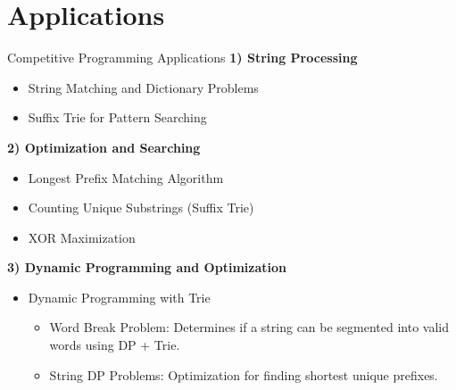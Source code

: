 \section{Applications}


\begin{frame}{Competitive Programming Applications}
    \textbf{1) String Processing}
\begin{itemize}
    \item String Matching and Dictionary Problems
    \item Suffix Trie for Pattern Searching
\end{itemize}

\textbf{2) Optimization and Searching}
\begin{itemize}
    \item Longest Prefix Matching Algorithm
    \item Counting Unique Substrings (Suffix Trie)
    \item XOR Maximization
\end{itemize}

\textbf{3) Dynamic Programming and Optimization}
\begin{itemize}
    \item Dynamic Programming with Trie
    \begin{itemize}
        \item Word Break Problem: Determines if a string can be segmented into valid words using DP + Trie.
        \item String DP Problems: Optimization for finding shortest unique prefixes.
    \end{itemize}
\end{itemize}
\end{frame}




